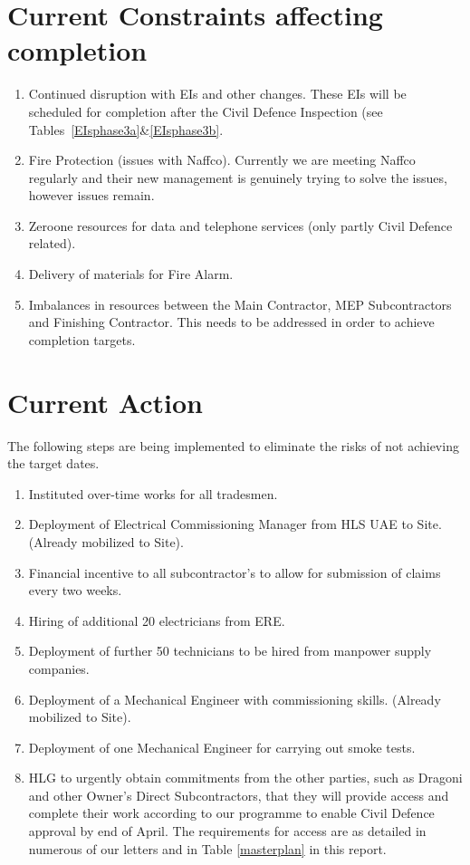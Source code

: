 \section*{Current Constraints affecting completion}

\begin{enumerate}
\item Continued disruption with EIs and other changes. These EIs will be scheduled for completion after the Civil Defence Inspection (see Tables~\ref{EIsphase3a}\&\ref{EIsphase3b}.
\item Fire Protection (issues with Naffco). Currently we are meeting Naffco regularly and their new management is genuinely trying to solve the issues, however issues remain.
\item Zeroone resources for data and telephone services (only partly Civil Defence related).
\item Delivery of materials for Fire Alarm. 
\item Imbalances in resources between the Main Contractor, MEP Subcontractors and Finishing Contractor. This needs to be addressed in order to achieve completion targets.
\end{enumerate}

\section*{Current Action}

The following steps are being implemented to eliminate the risks of not achieving the target dates.

\begin{enumerate}
\item  Instituted over-time works for all tradesmen.
\item  Deployment of Electrical Commissioning Manager from HLS UAE to Site. (Already mobilized to Site).
\item  Financial incentive to all subcontractor's to allow for submission of claims every two weeks.
\item  Hiring of additional 20 electricians from ERE.
\item  Deployment of further 50 technicians to be hired from manpower supply companies.
\item  Deployment of a Mechanical Engineer with commissioning skills.
(Already mobilized to Site).
\item  Deployment of one Mechanical Engineer for carrying out smoke tests.
\item HLG to urgently obtain commitments from the other parties, such as Dragoni and other Owner's Direct Subcontractors, that they will provide access and complete their work according to our programme to enable Civil Defence approval by end of April. The requirements for access are as detailed in numerous of our letters and in Table \ref{masterplan} in this report.
\end{enumerate}


